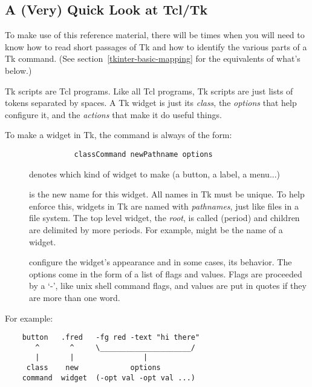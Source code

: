 \subsection{A (Very) Quick Look at Tcl/Tk} %

To make use of this reference material, there will be times when you
will need to know how to read short passages of Tk and how to identify
the various parts of a Tk command.  
(See section~\ref{tkinter-basic-mapping} for the
 equivalents of what's below.)

Tk scripts are Tcl programs.  Like all Tcl programs, Tk scripts are
just lists of tokens separated by spaces.  A Tk widget is just its
\emph{class}, the \emph{options} that help configure it, and the
\emph{actions} that make it do useful things. 

To make a widget in Tk, the command is always of the form: 

\begin{verbatim}
                classCommand newPathname options
\end{verbatim}

\begin{description}
\item[]
denotes which kind of widget to make (a button, a label, a menu...)

\item[]
is the new name for this widget.  All names in Tk must be unique.  To
help enforce this, widgets in Tk are named with \emph{pathnames}, just
like files in a file system.  The top level widget, the \emph{root},
is called  (period) and children are delimited by more
periods.  For example,  might be
the name of a widget.

\item[ ]
configure the widget's appearance and in some cases, its
behavior.  The options come in the form of a list of flags and values.
Flags are proceeded by a `-', like unix shell command flags, and
values are put in quotes if they are more than one word.
\end{description}

For example: 

\begin{verbatim}
    button   .fred   -fg red -text "hi there"
       ^       ^     \_____________________/
       |       |                |
     class    new            options
    command  widget  (-opt val -opt val ...)
\end{verbatim} 


